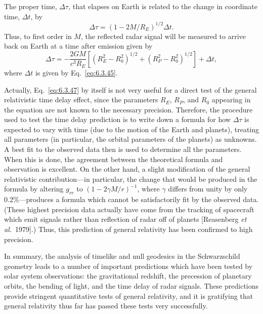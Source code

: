 The proper time, \(\Delta\tau\), that elapses on Earth is related to the change in
coordinate time, \(\Delta t\), by
\begin{equation}
  \Delta\tau=(1-2M/R_E)^{1/2}\Delta t.
  \tag{6.3.46}\label{eq:6.3.46}
\end{equation}
Thus, to first order in \(M\), the reflected radar signal will be measured to
arrive back on Earth at a time after emission given by
\begin{equation}
  \Delta\tau=-\frac{2GM}{c^3R_E}
  \left[(R_E^2-R_0^2)^{1/2}+(R_P^2-R_0^2)^{1/2}\right]+\Delta t,
  \tag{6.3.47}\label{eq:6.3.47}
\end{equation}
where \(\Delta t\) is given by Eq.~\eqref{eq:6.3.45}.

Actually, Eq.~\eqref{eq:6.3.47} by itself is not very useful for a direct test
of the general relativistic time delay effect, since the parameters \(R_E\),
\(R_P\), and \(R_0\) appearing in the equation are not known to the necessary
precision. Therefore, the procedure used to test the time delay prediction is to
write down a formula for how \(\Delta\tau\) is expected to vary with time (due to
the motion of the Earth and planets), treating all parameters (in particular, the
orbital parameters of the planets) as unknowns. A best fit to the observed data
then is used to determine all the parameters. When this is done, the agreement
between the theoretical formula and observation is excellent. On the other hand, a
slight modification of the general relativistic contribution---in particular, the
change that would be produced in the formula by altering \(g_{rr}\) to
\((1-2\gamma M/r)^{-1}\), where \(\gamma\) differs from unity by only
\(0.2\%\)---produces a formula which cannot be satisfactorily fit by the observed
data. (These highest precision data actually have come from the tracking of
spacecraft which emit signals rather than reflection of radar off of planets
[Reasenberg \emph{et al.}\ 1979].) Thus, this prediction of general relativity
has been confirmed to high precision.

In summary, the analysis of timelike and null geodesics in the Schwarzschild
geometry leads to a number of important predictions which have been tested by
solar system observations: the gravitational redshift, the precession of planetary
orbits, the bending of light, and the time delay of radar signals. These
predictions provide stringent quantitative tests of general relativity, and it is
gratifying that general relativity thus far has passed these tests very
successfully.
